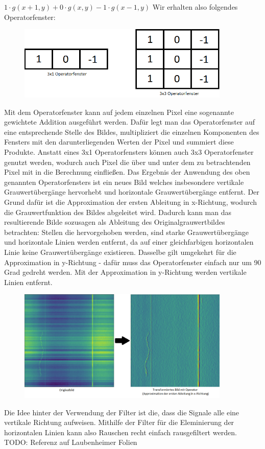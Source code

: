 \documentclass[11pt, a4paper]{article}
\begin{document}
$1\cdot g(x+1,y)+0\cdot g(x,y)-1\cdot g(x-1,y)$
\newline
Wir erhalten also folgendes Operatorfenster:
\begin{figure}[h]
\centering
\includegraphics[width=0.9\textwidth]{img/operatorfenster.png}
\end{figure}
\newline
Mit dem Operatorfenster kann auf jedem einzelnen Pixel eine sogenannte gewichtete Addition ausgeführt werden. Dafür legt man das Operatorfenster auf eine entsprechende Stelle des Bildes, multipliziert die einzelnen Komponenten des Fensters mit den darunterliegenden Werten der Pixel und summiert diese Produkte. Anstatt eines 3x1 Operatorfensters können auch 3x3 Operatorfenster genutzt werden, wodurch auch Pixel die über und unter dem zu betrachtenden Pixel mit in die Berechnung einfließen. Das Ergebnis der Anwendung des oben genannten Operatorfensters ist ein neues Bild welches insbesondere vertikale Grauwertübergänge hervorhebt und horizontale Grauwertübergänge entfernt. Der Grund dafür ist die Approximation der ersten Ableitung in x-Richtung, wodurch die Grauwertfunktion des Bildes abgeleitet wird. Dadurch kann man das resultierende Bilde sozusagen als Ableitung des Originalgrauwertbildes betrachten: Stellen die hervorgehoben werden, sind starke Grauwertübergänge und horizontale Linien werden entfernt, da auf einer gleichfarbigen horizontalen Linie keine Grauwertübergänge existieren. Dasselbe gilt umgekehrt für die Approximation in y-Richtung - dafür muss das Operatorfenster einfach nur um 90 Grad gedreht werden. Mit der Approximation in y-Richtung werden vertikale Linien entfernt.
\begin{figure}[h]
\centering
\includegraphics[width=0.9\textwidth]{img/original-vs-cv.png}
\end{figure}
\newline
Die Idee hinter der Verwendung der Filter ist die, dass die Signale alle eine vertikale Richtung aufweisen. Mithilfe der Filter für die Eleminierung der horizontalen Linien kann also Rauschen recht einfach rausgefiltert werden.
TODO: Referenz auf Laubenheimer Folien
\end{document}
